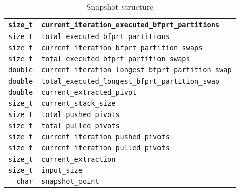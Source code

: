 \begin{table}[!ht]
\begin{tabularx}{\linewidth}{|r|X|}
    \hline
    \texttt{size\_t} & \texttt{current\_iteration\_executed\_bfprt\_partitions} \\ %
    \hline
    \texttt{size\_t} & \texttt{total\_executed\_bfprt\_partitions} \\ %
    \hline
    \texttt{size\_t} & \texttt{current\_iteration\_bfprt\_partition\_swaps} \\ %
    \hline
    \texttt{size\_t} & \texttt{total\_executed\_bfprt\_partition\_swaps} \\ %
    \hline
    \texttt{double} & \texttt{current\_iteration\_longest\_bfprt\_partition\_swap} \\ %
    \hline
    \texttt{double} & \texttt{total\_executed\_longest\_bfprt\_partition\_swap} \\ %
    \hline
    \texttt{double} & \texttt{current\_extracted\_pivot} \\ %
    \hline
    \texttt{size\_t} & \texttt{current\_stack\_size} \\ %
    \hline
    \texttt{size\_t} & \texttt{total\_pushed\_pivots} \\ %
    \hline
    \texttt{size\_t} & \texttt{total\_pulled\_pivots} \\ %
    \hline
    \texttt{size\_t} & \texttt{current\_iteration\_pushed\_pivots} \\ %
    \hline
    \texttt{size\_t} & \texttt{current\_iteration\_pulled\_pivots} \\ %
    \hline
    \texttt{size\_t} & \texttt{current\_extraction} \\ %
    \hline
    \texttt{size\_t} & \texttt{input\_size} \\ %
    \hline
    \texttt{char} & \texttt{snapshot\_point} \\ %
    \hline
\end{tabularx}
\caption{Snapshot structure}
\label{TABLE:SNAPSHOT_STRUCTURE}
\end{table}


